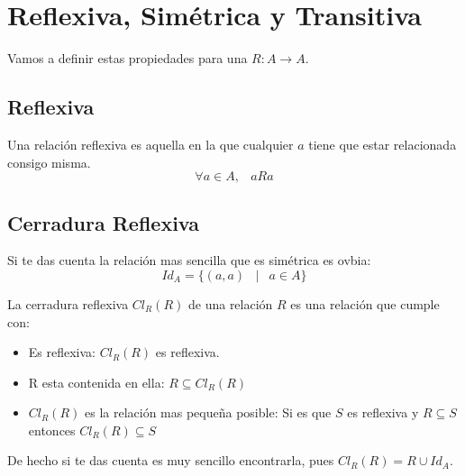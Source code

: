 \documentclass[12pt, fleqn]{report}                             %
\DeclareMathOperator \Space     {\quad}                         %
\DeclareMathOperator \MiniSpace {\;}                            %
\newcommand \Such           {\MiniSpace | \MiniSpace}           %
\theoremstyle{break}                                            %
\begin{document}
        \section{Reflexiva, Simétrica y Transitiva}

            Vamos a definir estas propiedades para una $R: A \to A$.
                
            \subsection{Reflexiva}

                Una relación reflexiva es aquella en la que cualquier $a$ tiene que estar relacionada
                consigo misma.
                \begin{equation*}
                    \forall a \in A, \MiniSpace aRa
                \end{equation*}


            \subsection*{Cerradura Reflexiva}

                Si te das cuenta la relación mas sencilla que es simétrica es ovbia:
                \begin{equation*}
                    Id_A = \{ (a, a) \Such a \in A \}
                \end{equation*}


                La cerradura reflexiva $Cl_R(R)$ de una relación $R$ es una relación que cumple con:

                \begin{itemize}
                    \item Es reflexiva: $Cl_R(R)$ es reflexiva. 
                    \item R esta contenida en ella: $R \subseteq Cl_R(R)$
                    \item $Cl_R(R)$ es la relación mas pequeña posible: 
                    Si es que $S$ es reflexiva y $R \subseteq S$ entonces $Cl_R(R) \subseteq S$
                \end{itemize}



                De hecho si te das cuenta es muy sencillo encontrarla, pues
                $Cl_R(R) = R \cup Id_A$.
\end{document}
